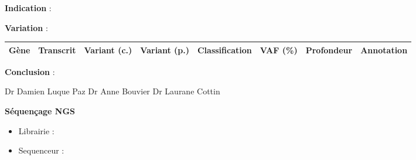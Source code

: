 \documentclass{letter}
\newcommand\tab[1][0.5cm]{\hspace*{#1}}
\begin{document}
    \textbf{Indication} :\\
    \IndicationNGS

    \bigskip

    {\large\textbf{Variation} :}
    
    \smallskip
    \begin{center}
        \begin{adjustwidth}{-1cm}{-1cm}
            \begin{tabularx}{\linewidth}{| c | c | X | X | X | c | c | c |}
                \hline
                G\`ene & Transcrit & Variant (c.) & Variant (p.) & Classification & VAF (\%) & Profondeur & Annotation \\
                \hline
            \end{tabularx}
        \end{adjustwidth}
    \end{center}

    \bigskip
    
    \textbf{Conclusion} : \\
    
    \smallskip
    
    \TextField[multiline, bordercolor={}, backgroundcolor={}, width=0.90\linewidth,
    height=5\baselineskip]{ }

    \medskip


    Dr Damien Luque Paz \tab \tab Dr Anne Bouvier \tab \tab \tab \tab Dr Laurane Cottin
    
    \newpage
    
    \textbf{S\'equençage NGS}
    \begin{itemize}[label={}]
        \item Librairie : \NGSLibrairie
        \item Sequenceur : \NGSSequenceur
    \end{itemize}

    \bigskip
\end{document}
